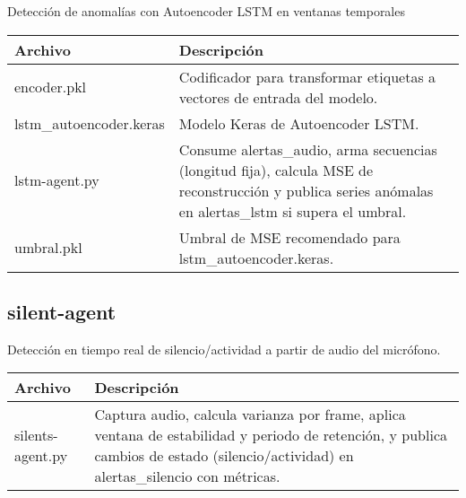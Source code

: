Detección de anomalías con Autoencoder LSTM en ventanas temporales

\begin{table}[H]
  \doublespacing
  \begin{tabularx}{\textwidth}{l X}
    \hline
    \textbf{Archivo}                             & \textbf{Descripción}                                                                                                                                   \\
    \hline
    encoder.pkl                                  & Codificador para transformar etiquetas a vectores de entrada del modelo.                                                                               \\
    lstm\_autoencoder.keras                     & Modelo Keras de Autoencoder LSTM.                                                                                                                      \\
    lstm-agent.py                                & Consume alertas\_audio, arma secuencias (longitud fija), calcula MSE de reconstrucción y publica series anómalas en alertas\_lstm si supera el umbral. \\
    umbral.pkl                                   & Umbral de MSE recomendado para lstm\_autoencoder.keras.                                                                                                \\
    \hline
  \end{tabularx}
\end{table}

\subsection*{silent-agent}

Detección en tiempo real de silencio/actividad a partir de audio del micrófono.

\begin{table}[H]
  \doublespacing
  \begin{tabularx}{\textwidth}{l X}
    \hline
    \textbf{Archivo} & \textbf{Descripción} \\
    \hline
    silents-agent.py &
    Captura audio, calcula varianza por frame, aplica ventana de estabilidad y periodo de retención, y publica cambios de estado (silencio/actividad) en alertas\_silencio con métricas.
    \\
    \hline
  \end{tabularx}
\end{table}

